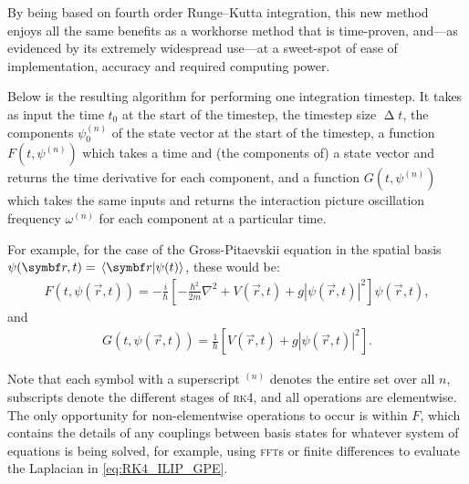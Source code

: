 By being based on fourth order Runge--Kutta integration, this new method enjoys all the same benefits as a workhorse method that is time-proven, and---as evidenced by its extremely widespread use---at a sweet-spot of ease of implementation, accuracy and required computing power.

Below is the resulting algorithm for performing one integration timestep. It takes as input the time $t_0$ at the start of the timestep, the timestep size $\upDelta t$, the components $\psi_0^{(n)}$ of the state vector at the start of the timestep, a function $F(t, \psi^{(n)})$ which takes a time and (the components of) a state vector and returns the time derivative for each component, and a function $G(t, \psi^{(n)})$ which takes the same inputs and returns the interaction picture oscillation frequency $\omega^{(n)}$ for each component at a particular time.

For example, for the case of the Gross-Pitaevskii equation in the spatial basis $\psi(\vec r, t) = \braket{\vec r}{\psi(t)}$, these would be:
\begin{align}\label{eq:RK4_ILIP_GPE}
F(t, \psi(\vec r, t)) = -\frac i \hbar\left[-\frac{\hbar^2}{2m}\nabla^2 + V(\vec r, t) + g|\psi(\vec r, t)|^2\right]\psi(\vec r, t),
\end{align}
and
\begin{align}
G(t, \psi(\vec r, t)) = \frac1\hbar\left[V(\vec r, t) + g|\psi(\vec r, t)|^2\right].
\end{align}

Note that each symbol with a superscript $^{(n)}$ denotes the entire set over all $n$, subscripts denote the different stages of \textsc{rk4}, and all operations are elementwise. The only opportunity for non-elementwise operations to occur is within $F$, which contains the details of any couplings between basis states for whatever system of equations is being solved, for example, using \textsc{fft}s or finite differences to evaluate the Laplacian in \eqref{eq:RK4_ILIP_GPE}.


